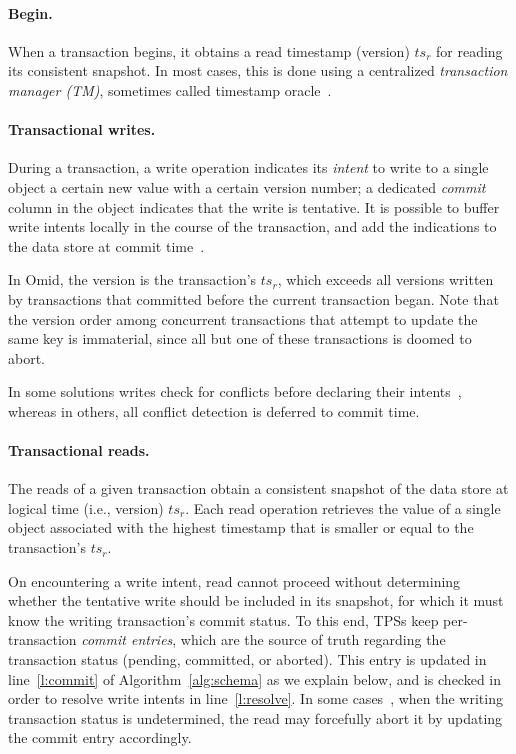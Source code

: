 \paragraph{Begin.} 
  When a transaction begins, it obtains a read timestamp (version) $ts_r$ for reading its consistent snapshot.
 In most cases, this is done using a centralized \emph{transaction manager (TM)}, sometimes called timestamp 
 oracle~\cite{Percolator2010,OmidICDE2014}. 

\paragraph{Transactional writes.} 
 During a transaction, a write operation indicates its \emph{intent} to write to a single object a certain new value with a certain version number;
a dedicated \emph{commit} column in the object indicates that the write is tentative.
It is possible to buffer write intents locally in the course of the transaction, and add the indications to the data store at commit time~\cite{Percolator2010}.

In Omid, the version is the transaction's $ts_r$, which exceeds all versions written by transactions that committed before the
current transaction began. Note that the version order among concurrent transactions that  attempt to update the same key is immaterial, 
since all but one of these transactions is doomed to abort. 

In some solutions writes check for conflicts before declaring their intents~\cite{cockroach}, whereas in others, 
all conflict detection is deferred to commit time. 

\paragraph{Transactional reads.} 
The reads of a given transaction obtain a consistent snapshot of the data store at logical time (i.e., version) $ts_r$.
Each read operation retrieves the value of a single object associated with the highest timestamp that is 
smaller or equal to the transaction's $ts_r$. 

On encountering a write intent, read cannot proceed without determining whether the tentative write should be included in its snapshot,
for which it must know the writing transaction's commit status. 
To this end, TPSs keep per-transaction \emph{commit entries}, which are the source of truth regarding the transaction status 
(pending, committed, or aborted). 
This entry is updated in line~\ref{l:commit} of Algorithm~\ref{alg:schema} as we explain below, 
and is checked in order to resolve write intents in line~\ref{l:resolve}.
In some cases~\cite{Percolator2010,cockroach}, when the writing transaction status is undetermined, the read may forcefully abort
it by updating the commit entry accordingly.

